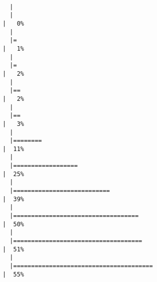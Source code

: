 \documentclass[
  letterpaper,
]{book}
\newenvironment{Shaded}{\begin{snugshade}}{\end{snugshade}}
\newcommand{\AttributeTok}[1]{\textcolor[rgb]{0.40,0.45,0.13}{#1}}
\newcommand{\ConstantTok}[1]{\textcolor[rgb]{0.56,0.35,0.01}{#1}}
\newcommand{\FunctionTok}[1]{\textcolor[rgb]{0.28,0.35,0.67}{#1}}
\newcommand{\NormalTok}[1]{\textcolor[rgb]{0.00,0.23,0.31}{#1}}
\newcommand{\OtherTok}[1]{\textcolor[rgb]{0.00,0.23,0.31}{#1}}
\newcommand{\SpecialCharTok}[1]{\textcolor[rgb]{0.37,0.37,0.37}{#1}}
\newcommand{\StringTok}[1]{\textcolor[rgb]{0.13,0.47,0.30}{#1}}
\begin{document}
\begin{Shaded}
\end{Shaded}

\begin{verbatim}

  |                                                                            
  |                                                                      |   0%
  |                                                                            
  |=                                                                     |   1%
  |                                                                            
  |=                                                                     |   2%
  |                                                                            
  |==                                                                    |   2%
  |                                                                            
  |==                                                                    |   3%
  |                                                                            
  |========                                                              |  11%
  |                                                                            
  |==================                                                    |  25%
  |                                                                            
  |===========================                                           |  39%
  |                                                                            
  |===================================                                   |  50%
  |                                                                            
  |====================================                                  |  51%
  |                                                                            
  |=======================================                               |  55%

\end{verbatim}
\end{document}
